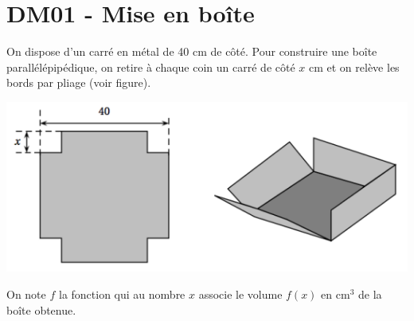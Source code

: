 \documentclass[a4paper,11pt]{article}
\author{Pierquet}
\title{\nomfichier}
\begin{document}
	
\pagestyle{fancy}

\thispagestyle{entetedm}
	
\part{DM01 - Mise en boîte}

\medskip

On dispose d’un carré en métal de 40 cm de côté. Pour construire une boîte parallélépipédique, on retire à chaque coin un carré de côté $x$ cm et on relève les bords par pliage (voir figure).
\begin{center}
\includegraphics[scale=0.7]{graphics/dm05_patron}
\end{center}

On note $f$ la fonction qui au nombre $x$ associe le volume $f(x)$ en cm$^3$ de la boîte obtenue.
\end{document}
